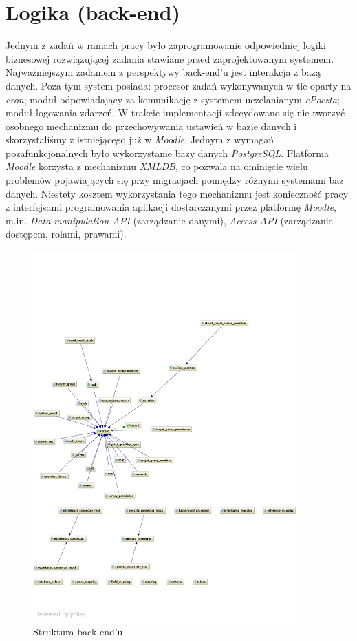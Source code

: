 \section{Logika (back-end)}
\label{Chapter66}

Jednym z zadań w ramach pracy było zaprogramowanie odpowiedniej logiki biznesowej rozwiązującej zadania stawiane przed zaprojektowanym systemem. Najważniejszym zadaniem z perspektywy back-end'u jest interakcja z bazą danych. Poza tym system posiada: procesor zadań wykonywanych w tle oparty na \emph{cron}; moduł odpowiadający za komunikację z systemem uczelanianym \emph{ePoczta}; moduł logowania zdarzeń. W trakcie implementacji zdecydowano się nie tworzyć osobnego mechanizmu do przechowywania ustawień w bazie danych i skorzystaliśmy z istniejącego już w \emph{Moodle}. Jednym z wymagań pozafunkcjonalnych było wykorzystanie bazy danych \emph{PostgreSQL}. Platforma \emph{Moodle} korzysta z mechanizmu \emph{XMLDB}, co pozwala na ominięcie wielu problemów pojawiających się przy migracjach pomiędzy różnymi systemami baz danych. Niestety kosztem wykorzystania tego mechanizmu jest konieczność pracy z interfejsami programowania aplikacji dostarczanymi przez platformę \emph{Moodle}, m.in. \emph{Data manipulation API} (zarządzanie danymi), \emph{Access API} (zarządzanie dostępem, rolami, prawami).\\

\begin{figure}[H]
\begin{center}
\includegraphics[width=0.9\textwidth]{figures/lw/backend.pdf} 
\end{center}
\caption{Struktura back-end'u}
\label{fig:back-end}
\end{figure}

